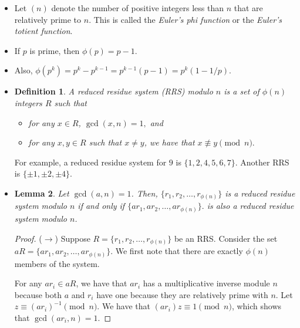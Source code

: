 \documentclass{article}
\newtheorem{lemma}{Lemma}[section]
\newtheorem{definition}[lemma]{Definition}
\begin{document}
  \begin{itemize}
    \item Let $
    (n)$ denote the number of positive integers
      less than $n$ that are relatively prime to $n$. This is called the \emph{Euler's phi function}
      or the \emph{Euler's totient function}.
      
    \item If $p$ is prime, then $\phi(p) = p-1$.
    
    \item Also, $\phi(p^k) = p^k - p^{k-1} = p^{k-1}(p-1) = p^k(1 - 1/p).$
    
    \item \begin{definition}
      A \emph{reduced residue system (RRS) modulo $n$} is a set of $\phi(n)$ integers $R$
      such that
      \begin{itemize}
        \item for any $x \in R$, $\gcd(x,n) = 1,$ and
        \item for any $x, y \in R$ such that $x \neq y$, we have
          that $x \not\equiv y \pmod{n}.$
      \end{itemize}
    \end{definition}
    For example, a reduced residue system for $9$ is $\{ 1, 2, 4, 5, 6, 7 \}.$
    Another RRS is $\{ \pm 1, \pm 2, \pm 4 \}.$
    
    \item 
      \begin{lemma}
        Let $\gcd(a,n) = 1$. Then, $\{ r_1, r_2, \dotsc, r_{\phi(n)} \}$ is
        a reduced residue system modulo $n$ if and only if $\{ a r_1, a r_2, \dotsc, a r_{\phi(n)} \}.$
        is also a reduced residue system modulo $n$.
      \end{lemma}
      
      \begin{proof}
        ($\rightarrow$) Suppose $R = \{ r_1, r_2, \dotsc, r_{\phi(n)}\}$ be an RRS. Consider
        the set $aR = \{ a r_1, a r_2, \dotsc, a r_{\phi(n)}\}$. We first note
        that there are exactly $\phi(n)$ members of the system. 
        
        For any $ar_i \in aR$, we have that $ar_i$ has a multiplicative inverse module $n$
        because both $a$ and $r_i$ have one because they are relatively prime with $n$.
        Let $z \equiv (ar_i)^{-1} \pmod{n}.$ We have that $(ar_i)z \equiv 1 \pmod{n}$,
        which shows that $\gcd(ar_i, n) = 1$.
        

\end{proof}
\end{itemize}
\end{document}
